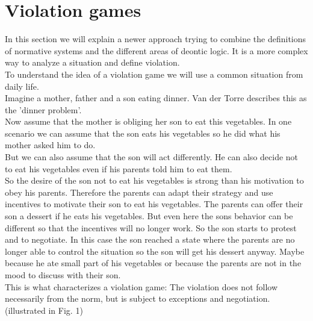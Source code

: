 \documentclass[conference]{IEEE}
\begin{document}
\section{Violation games}
In this section we will explain a newer approach trying to combine the definitions of normative systems and the different areas of deontic logic. It is a more complex way to analyze a situation and define violation.\\
To understand the idea of a violation game we will use a common situation from daily life.\\
Imagine a mother, father and a son eating dinner. Van der Torre describes this as the 'dinner problem'.\\
Now assume that the mother is obliging her son to eat this vegetables. In one scenario we can assume that the son eats his vegetables so he did what his mother asked him to do.\\
But we can also assume that the son will act differently. He can also decide not to eat his vegetables even if his parents told him to eat them.\\
So the desire of the son not to eat his vegetables is strong than his motivation to obey his parents. Therefore the parents can adapt their strategy and use incentives to motivate their son to eat his vegetables. The parents can offer their son a dessert if he eats his vegetables. But even here the sons behavior can be different so that the incentives will no longer work. So the son starts to protest and to negotiate. In this case the son reached a state where the parents are no longer able to control the situation so the son will get his dessert anyway. Maybe because he ate small part of his vegetables or because the parents are not in the mood to discuss with their son.\\
This is what characterizes a violation game: The violation does not follow necessarily from the norm, but is subject to exceptions and negotiation. (illustrated in Fig. 1)
\end{document}
